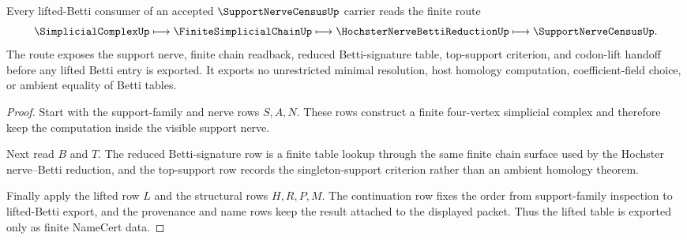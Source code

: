 \begin{theorem}
\label{thm:support-nerve-census-lifted-betti-handoff}
Every lifted-Betti consumer of an accepted $\SupportNerveCensusUp$ carrier reads the finite route
$$
\SimplicialComplexUp
\longmapsto
\FiniteSimplicialChainUp
\longmapsto
\HochsterNerveBettiReductionUp
\longmapsto
\SupportNerveCensusUp .
$$
The route exposes the support nerve, finite chain readback, reduced Betti-signature table, top-support criterion, and codon-lift handoff before any lifted Betti entry is exported. It exports no unrestricted minimal resolution, host homology computation, coefficient-field choice, or ambient equality of Betti tables.
\end{theorem}
\begin{proof}
Start with the support-family and nerve rows $S,A,N$. These rows construct a finite four-vertex simplicial complex and therefore keep the computation inside the visible support nerve.

Next read $B$ and $T$. The reduced Betti-signature row is a finite table lookup through the same finite chain surface used by the Hochster nerve--Betti reduction, and the top-support row records the singleton-support criterion rather than an ambient homology theorem.

Finally apply the lifted row $L$ and the structural rows $H,R,P,M$. The continuation row fixes the order from support-family inspection to lifted-Betti export, and the provenance and name rows keep the result attached to the displayed packet. Thus the lifted table is exported only as finite NameCert data.
\end{proof}



